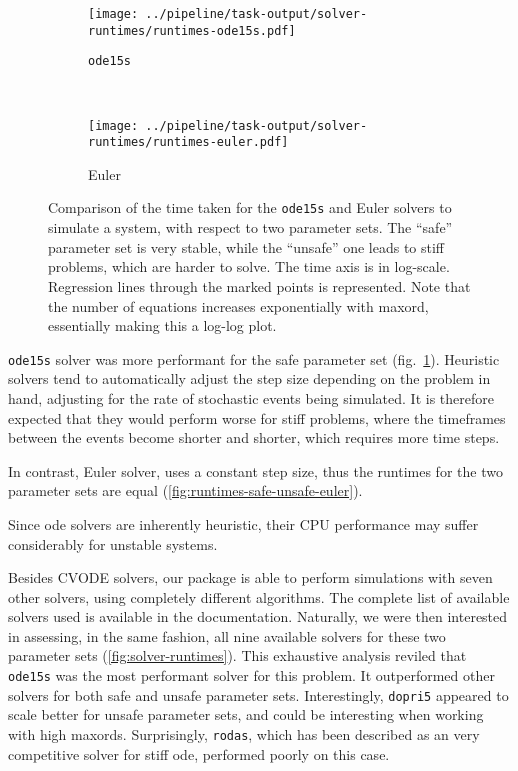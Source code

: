 \begin{figure}[tb]
   \centering
   \begin{subfigure}[t]{0.45\textwidth}
       \texttt{[image: ../pipeline/task-output/solver-runtimes/runtimes-ode15s.pdf]}
       \caption{\texttt{ode15s}}
       \label{fig:runtimes-safe-unsafe-ode15s}
   \end{subfigure}
   ~
   \begin{subfigure}[t]{0.45\textwidth}
       \texttt{[image: ../pipeline/task-output/solver-runtimes/runtimes-euler.pdf]}
       \caption{Euler}
       \label{fig:runtimes-safe-unsafe-euler}
   \end{subfigure}
   
    \caption{Comparison of the time taken for the {\tt ode15s} and Euler solvers to simulate a system, with respect to two parameter sets.
     The ``safe'' parameter set is very stable, while the ``unsafe'' one leads to stiff problems, which are harder to solve.
    The time axis is in log-scale. Regression lines through the marked points is represented.
    Note that the number of equations increases exponentially with \gls{maxord}, essentially making this a log-log plot.}
\label{fig:runtimes-safe-unsafe}
\end{figure}

\texttt{ode15s} solver was more performant for the safe parameter set (fig.~\ref{fig:runtimes-safe-unsafe-ode15s}).
Heuristic solvers tend to automatically adjust the step size depending on the problem in hand, adjusting for the rate of stochastic events being simulated.
It is therefore expected that they would perform worse for stiff problems, where the timeframes between the events become shorter and shorter, which requires more time steps.

In contrast, Euler solver, uses a constant step size, thus the runtimes for the two parameter sets are equal (\autoref{fig:runtimes-safe-unsafe-euler}).

Since \gls{ode} solvers are inherently heuristic, their CPU performance may suffer considerably for unstable systems.

Besides CVODE solvers, our package is able to perform simulations with seven other solvers, using completely different algorithms.
The complete list of available solvers used is available in the documentation.
Naturally, we were then interested in assessing, in the same fashion, all nine available solvers for these two parameter sets (\autoref{fig:solver-runtimes}).
This exhaustive analysis reviled that \texttt{ode15s} was the most performant solver for this problem.
It outperformed other solvers for both safe and unsafe parameter sets.
Interestingly, \texttt{dopri5} appeared to scale better for unsafe parameter sets, and could be interesting when working with high \gls{maxord}s.
Surprisingly, \texttt{rodas}, which has been described as an very competitive solver for stiff \gls{ode}\cite{sandu_benchmarking_1997},
performed poorly on this case.

